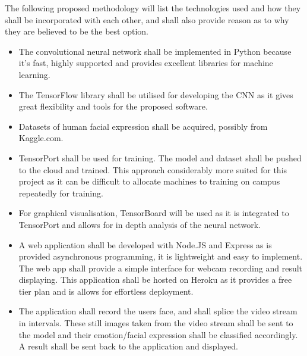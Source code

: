 
The following proposed methodology will list the technologies used and how they shall be incorporated with each other, and shall also provide reason as to why they are believed to be the best option. 

\begin{itemize}
\item The convolutional neural network shall be implemented in Python because it's fast, highly supported and provides excellent libraries for machine learning. 
\item The TensorFlow library shall be utilised for developing the CNN as it gives great flexibility and tools for the proposed software.
\item Datasets of human facial expression shall be acquired, possibly from Kaggle.com.
\item TensorPort shall be used for training. The model and dataset shall be pushed to the cloud and trained. This approach considerably more suited for this project as it can be difficult to allocate machines to training on campus repeatedly for training.
\item For graphical visualisation, TensorBoard will be used as it is integrated to TensorPort and allows for in depth analysis of the neural network. 
\item A web application shall be developed with Node.JS and Express as is provided asynchronous programming, it is lightweight and easy to implement. The web app shall provide a simple interface for webcam recording and result displaying. This application shall be hosted on Heroku as it provides a free tier plan and is allows for effortless deployment.
\item The application shall record the users face, and shall splice the video stream in intervals. These still images taken from the video stream shall be sent to the model and their emotion/facial expression shall be classified accordingly. A result shall be sent back to the application and displayed.

\end{itemize}

